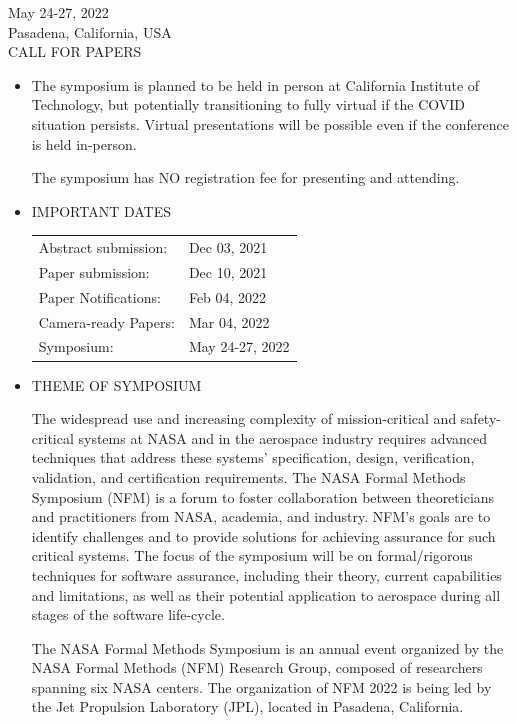 \documentclass[prodmode,acmtecs]{acmsmall} %
\begin{document}
  May 24-27, 2022\\ 
  Pasadena, California, USA\\ 
CALL FOR PAPERS 

\begin{itemize}\item  The symposium is planned to be held in person at California Institute of Technology, but potentially transitioning to fully virtual if the COVID situation persists. Virtual presentations will be possible even if the conference is held in-person. 
 
  The symposium has NO registration fee for presenting and attending. 
 
\item  IMPORTANT DATES 
 
\begin{tabulary}{\linewidth}{LL}Abstract submission:  & Dec 03, 2021 \\
Paper submission:  & Dec 10, 2021 \\
Paper Notifications:  & Feb 04, 2022 \\
Camera-ready Papers:  & Mar 04, 2022 \\
Symposium:  & May 24-27, 2022 \\
\end{tabulary}
 
\item  THEME OF SYMPOSIUM 
 
  The widespread use and increasing complexity of mission-critical and safety-critical systems at NASA and in the aerospace industry requires advanced techniques that address these systems' specification, design, verification, validation, and certification requirements. The NASA Formal Methods Symposium (NFM) is a forum to foster collaboration between theoreticians and practitioners from NASA, academia, and industry. NFM's goals are to identify challenges and to provide solutions for achieving assurance for such critical systems. The focus of the symposium will be on formal/rigorous techniques for software assurance, including their theory, current capabilities and limitations, as well as their potential application to aerospace during all stages of the software life-cycle. 
 
  The NASA Formal Methods Symposium is an annual event organized by the NASA Formal Methods (NFM) Research Group, composed of researchers spanning six NASA centers. The organization of NFM 2022 is being led by the Jet Propulsion Laboratory (JPL), located in Pasadena, California. 
 

\end{itemize}
\end{document}
